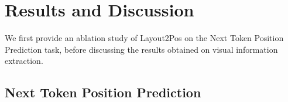 


\section{Results and Discussion}


We first provide an ablation study of Layout2Pos on the Next Token Position Prediction task, before discussing the results obtained on visual information extraction.

\subsection{Next Token Position Prediction}
\label{section:layout2pos-results-ntpp}

